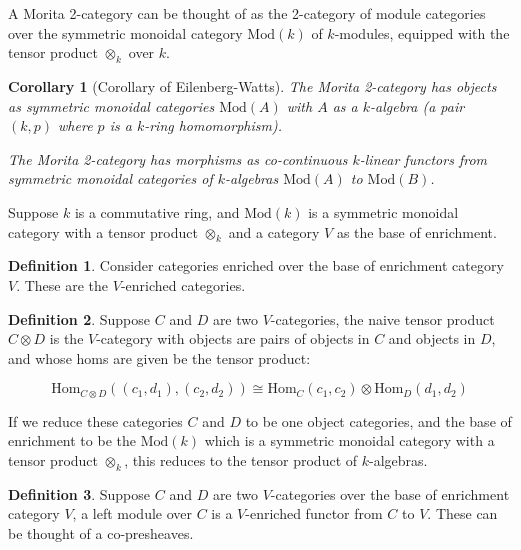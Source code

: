 \documentclass[10pt]{article}
\theoremstyle{plain}%
\newtheorem*{corollary}{Corollary}
\theoremstyle{definition}
\newtheorem{definition}{Definition}[section]
\theoremstyle{remark}
\begin{document}
A Morita 2-category can be thought of as the 2-category of module categories over the symmetric monoidal category $\mathrm{Mod}(k)$ of $k$-modules, equipped with the tensor product $\otimes_k$ over $k$.

\begin{corollary}[Corollary of Eilenberg-Watts]
	The Morita 2-category has objects as symmetric monoidal categories $\mathrm{Mod}(A)$ with $A$ as a $k$-algebra (a pair $(k, p)$ where $p$ is a $k$-ring homomorphism).

	The Morita 2-category has morphisms as co-continuous $k$-linear functors from symmetric monoidal categories of $k$-algebras $\mathrm{Mod}(A)$ to $\mathrm{Mod}(B)$.
\end{corollary}

Suppose $k$ is a commutative ring, and $\mathrm{Mod}(k)$ is a symmetric monoidal category with a tensor product $\otimes_k$ and a category $V$ as the base of enrichment.

\begin{definition}
	Consider categories enriched over the base of enrichment category $V$. These are the $V$-enriched categories.
\end{definition}

\begin{definition}
	Suppose $C$ and $D$ are two $V$-categories, the naive tensor product $C \otimes D$ is the $V$-category with objects are pairs of objects in $C$ and objects in $D$, and whose homs are given be the tensor product:

\begin{equation}
	\mathrm{Hom}_{C \otimes D} ((c_1, d_1), (c_2, d_2)) \cong \mathrm{Hom}_{C}(c_1, c_2) \otimes \mathrm{Hom}_{D}(d_1, d_2)
\end{equation}

\end{definition}

If we reduce these categories $C$ and $D$ to be one object categories, and the base of enrichment to be the $\mathrm{Mod}(k)$ which is a symmetric monoidal category with a tensor product $\otimes_k$, this reduces to the tensor product of $k$-algebras.

\begin{definition}
	Suppose $C$ and $D$ are two $V$-categories over the base of enrichment category $V$, a left module over $C$ is a $V$-enriched functor from $C$ to $V$. These can be thought of a co-presheaves.
\end{definition}
\end{document}
